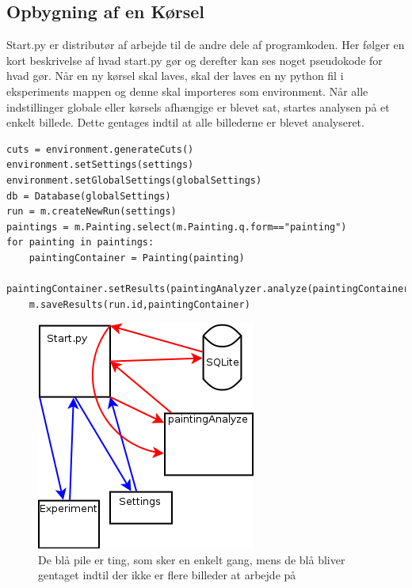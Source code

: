 {
\subsection{Opbygning af en Kørsel}
Start.py er distributør af arbejde til de andre dele af programkoden.
Her følger en kort beskrivelse af hvad start.py gør og derefter kan ses
noget pseudokode for hvad gør.
Når en ny kørsel skal laves, skal der laves en ny python fil i
eksperiments mappen og denne skal importeres som environment.
Når alle indstillinger globale eller kørsels afhængige er blevet sat,
startes analysen på et enkelt billede. Dette gentages indtil at alle
billederne er blevet analyseret.

\begin{lstlisting}
cuts = environment.generateCuts()
environment.setSettings(settings)
environment.setGlobalSettings(globalSettings)
db = Database(globalSettings)
run = m.createNewRun(settings)
paintings = m.Painting.select(m.Painting.q.form=="painting")
for painting in paintings:
	paintingContainer = Painting(painting)
	paintingContainer.setResults(paintingAnalyzer.analyze(paintingContainer,settings))
	m.saveResults(run.id,paintingContainer)
\end{lstlisting}
\begin{figure}[h!]
	\begin{center}
		\includegraphics[scale=0.5]{afsnit/implementation/billeder/workflow_start_py.png}
	\end{center}
	\caption{De blå pile er ting, som sker en enkelt gang, mens de blå
	bliver gentaget indtil der ikke er flere billeder at arbejde på}
\end{figure}



}

